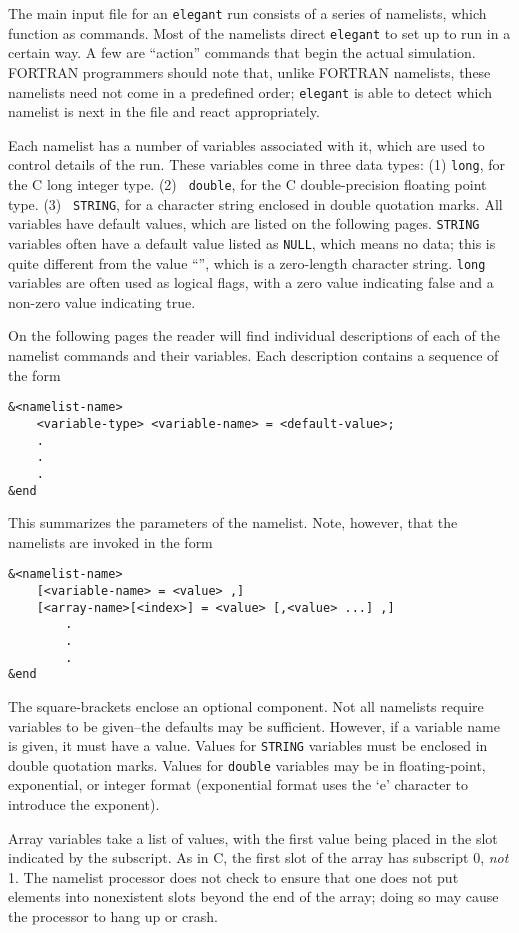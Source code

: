 \documentclass[11pt]{article}
\begin{document}
The main input file for an {\tt elegant} run consists of a series of
namelists, which function as commands.  Most of the namelists direct
{\tt elegant} to set up to run in a certain way.  A few are ``action''
commands that begin the actual simulation.  FORTRAN programmers should
note that, unlike FORTRAN namelists, these namelists need not come in
a predefined order; {\tt elegant} is able to detect which namelist is
next in the file and react appropriately.

Each namelist has a number of variables associated with it, which are
used to control details of the run.  These variables come in three
data types: (1) {\tt long}, for the C long integer type.  (2) {\tt
double}, for the C double-precision floating point type. (3) {\tt
STRING}, for a character string enclosed in double quotation marks.
All variables have default values, which are listed on the following
pages.  {\tt STRING} variables often have a default value listed as
{\tt NULL}, which means no data; this is quite different from the
value ``'', which is a zero-length character string.  {\tt long}
variables are often used as logical flags, with a zero value
indicating false and a non-zero value indicating true.

On the following pages the reader will find individual descriptions of each of the namelist commands and their 
variables.  Each description contains a sequence of the form
\begin{verbatim}
&<namelist-name>
    <variable-type> <variable-name> = <default-value>;
    .
    .
    .
&end
\end{verbatim}
This summarizes the parameters of the namelist.  Note, however, that the namelists are invoked in the form
\begin{verbatim}
&<namelist-name>
    [<variable-name> = <value> ,]
    [<array-name>[<index>] = <value> [,<value> ...] ,]
        .
        .
        .
&end
\end{verbatim}  The square-brackets enclose an optional component.  Not all namelists require variables to 
be given--the defaults may be sufficient.  However, if a variable name
is given, it must have a value.  Values for \verb|STRING| variables
must be enclosed in double quotation marks.  Values for \verb|double|
variables may be in floating-point, exponential, or integer format
(exponential format uses the `e' character to introduce the exponent).

Array variables take a list of values, with the first value being
placed in the slot indicated by the subscript.  As in C, the first
slot of the array has subscript 0, {\em not} 1.  The namelist
processor does not check to ensure that one does not put elements into
nonexistent slots beyond the end of the array; doing so may cause the
processor to hang up or crash.
\end{document}
